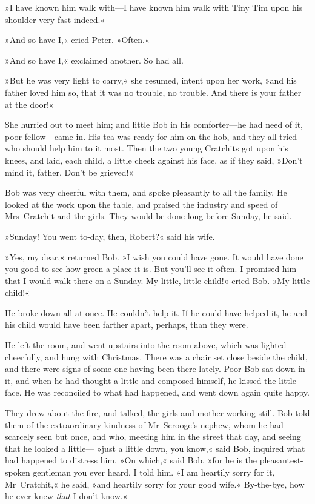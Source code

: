 »I have known him walk with—I have known him walk with Tiny Tim upon his shoulder very fast indeed.«

»And so have I,« cried Peter. »Often.«

»And so have I,« exclaimed another. So had all.

»But he was very light to carry,« she resumed, intent upon her work, »and his father loved him so, that it was no trouble, no trouble. And there is your father at the door!«

She hurried out to meet him; and little Bob in his comforter—he had need of it, poor fellow—came in. His tea was ready for him on the hob, and they all tried who should help him to it most. Then the two young Cratchits got upon his knees, and laid, each child, a little cheek against his face, as if they said, »Don't mind it, father. Don't be grieved!«

Bob was very cheerful with them, and spoke pleasantly to all the family. He looked at the work upon the table, and praised the industry and speed of Mrs~Cratchit and the girls. They would be done long before Sunday, he said.

»Sunday! You went to-day, then, Robert?« said his wife.

»Yes, my dear,« returned Bob. »I wish you could have gone. It would have done you good to see how green a place it is. But you'll see it often. I promised him that I would walk there on a Sunday. My little, little child!« cried Bob. »My little child!«

He broke down all at once. He couldn't help it. If he could have helped it, he and his child would have been farther apart, perhaps, than they were.

He left the room, and went upstairs into the room above, which was lighted cheerfully, and hung with Christmas. There was a chair set close beside the child, and there were signs of some one having been there lately. Poor Bob sat down in it, and when he had thought a little and composed himself, he kissed the little face. He was reconciled to what had happened, and went down again quite happy.

They drew about the fire, and talked, the girls and mother working still. Bob told them of the extraordinary kindness of Mr~Scrooge's nephew, whom he had scarcely seen but once, and who, meeting him in the street that day, and seeing that he looked a little— »just a little down, you know,« said Bob, inquired what had happened to distress him. »On which,« said Bob, »for he is the pleasantest-spoken gentleman you ever heard, I told him. »I am heartily sorry for it, Mr~Cratchit,« he said, »and heartily sorry for your good wife.« By-the-bye, how he ever knew \textit{that} I don't know.«

